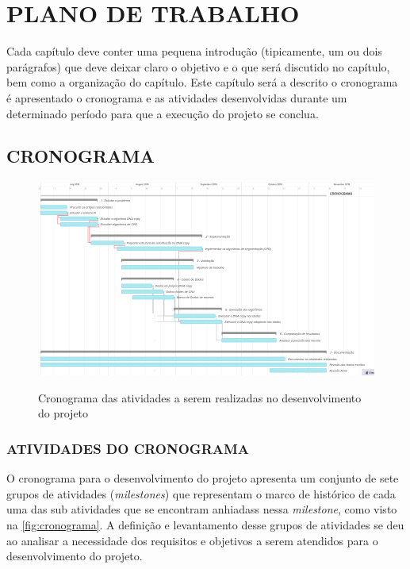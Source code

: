 
\chapter{PLANO DE TRABALHO}
\label{chap:planoDeTrabalho}

Cada capítulo deve conter uma pequena introdução (tipicamente, um ou dois parágrafos) que deve deixar claro o objetivo e o que será discutido no capítulo, bem como a organização do capítulo.
Este capítulo será a descrito o cronograma 
 é apresentado o cronograma e as atividades desenvolvidas durante um determinado período para que a execução do projeto se conclua.

\section{CRONOGRAMA}

\begin{figure}[!htb]
    \centering
    \caption{Cronograma das atividades a serem realizadas no desenvolvimento do projeto}
    \includegraphics[width=1\textwidth]{./dados/figuras/cronograma}
    \label{fig:cronograma}
\end{figure}

\subsection{ATIVIDADES DO CRONOGRAMA}

O cronograma para o desenvolvimento do projeto apresenta um conjunto de sete grupos de atividades (\textit{milestones}) que representam o marco de histórico de cada uma das sub atividades que se encontram anhiadass nessa \textit{milestone}, como visto na \autoref{fig:cronograma}. A definição e levantamento desse grupos de atividades se deu ao analisar a necessidade dos requisitos e objetivos a serem atendidos para o desenvolvimento do projeto.

